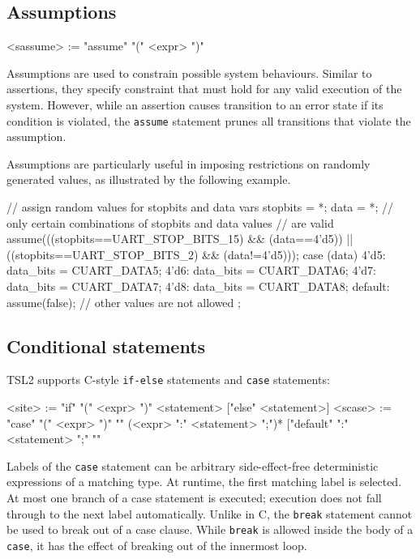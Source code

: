 \documentclass{report}
\newcommand{\src}[1]{\texttt{#1}}
\newcommand{\tsl}{TSL2 }
\begin{document}
\subsection{Assumptions}  

\begin{bnflisting}{}
<sassume> := "assume" "(" <expr> ")"
\end{bnflisting}

Assumptions are used to constrain possible system behaviours.  
Similar to assertions, they specify constraint that must hold for 
any valid execution of the system.  However, while an assertion 
causes transition to an error state if its condition is violated, 
the \src{assume} statement prunes all transitions that violate the 
assumption.

Assumptions are particularly useful in imposing restrictions on 
randomly generated values, as illustrated by the following 
example.
\begin{tsllisting}{}
// assign random values for stopbits and data vars
stopbits  = *;
data      = *;
// only certain combinations of stopbits and data values 
// are valid
assume(((stopbits==UART_STOP_BITS_15) && (data==4'd5)) || 
        ((stopbits==UART_STOP_BITS_2) && (data!=4'd5)));
case (data) {
    4'd5:       data_bits = CUART_DATA5;
    4'd6:       data_bits = CUART_DATA6;
    4'd7:       data_bits = CUART_DATA7;
    4'd8:       data_bits = CUART_DATA8;
    default: assume(false); // other values are not allowed
};
\end{tsllisting}

\subsection{Conditional statements}\label{s:r:coniditional}

\tsl supports C-style \src{if-else} statements and \src{case} 
statements:
\begin{bnflisting}{}
<site>  := "if" "(" <expr> ")" <statement>
             ["else" <statement>]
<scase> := "case" "(" <expr> ")" "{"
             (<expr> ":" <statement> ";")*
             ["default" ":" <statement> ";"
           "}"
\end{bnflisting}

Labels of the \src{case} statement can be arbitrary 
side-effect-free deterministic expressions of a matching type.  At 
runtime, the first matching label is selected.  At most one branch 
of a case statement is executed; execution does not fall through 
to the next label automatically.  Unlike in C, the \src{break} 
statement cannot be used to break out of a case clause.  While 
\src{break} is allowed inside the body of a \src{case}, it has the 
effect of breaking out of the innermost loop.
\end{document}
